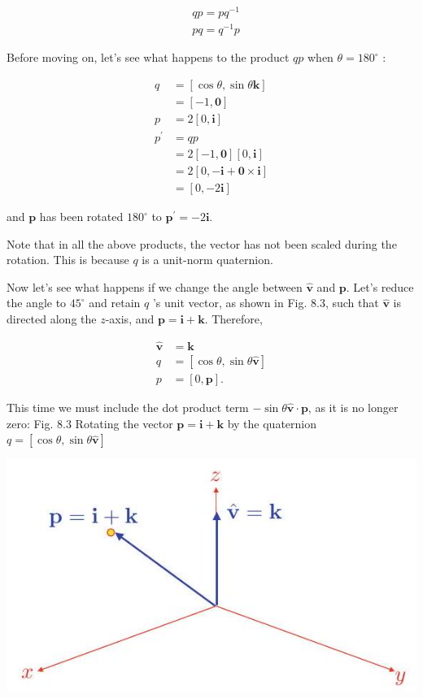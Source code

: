\documentclass[10pt]{article}
\begin{document}
$$
\begin{aligned}
& q p=p q^{-1} \\
& p q=q^{-1} p
\end{aligned}
$$

Before moving on, let's see what happens to the product $q p$ when $\theta=180^{\circ}$ :

$$
\begin{aligned}
q & =[\cos \theta, \sin \theta \mathbf{k}] \\
& =[-1, \mathbf{0}] \\
p & =2[0, \mathbf{i}] \\
p^{\prime} & =q p \\
& =2[-1, \mathbf{0}][0, \mathbf{i}] \\
& =2[0,-\mathbf{i}+\mathbf{0} \times \mathbf{i}] \\
& =[0,-2 \mathbf{i}]
\end{aligned}
$$

and $\mathbf{p}$ has been rotated $180^{\circ}$ to $\mathbf{p}^{\prime}=-2 \mathbf{i}$.

Note that in all the above products, the vector has not been scaled during the rotation. This is because $q$ is a unit-norm quaternion.

Now let's see what happens if we change the angle between $\hat{\mathbf{v}}$ and $\mathbf{p}$. Let's reduce the angle to $45^{\circ}$ and retain $q$ 's unit vector, as shown in Fig. 8.3, such that $\hat{\mathbf{v}}$ is directed along the $z$-axis, and $\mathbf{p}=\mathbf{i}+\mathbf{k}$. Therefore,

$$
\begin{aligned}
\hat{\mathbf{v}} & =\mathbf{k} \\
q & =[\cos \theta, \sin \theta \hat{\mathbf{v}}] \\
p & =[0, \mathbf{p}] .
\end{aligned}
$$

This time we must include the dot product term $-\sin \theta \hat{\mathbf{v}} \cdot \mathbf{p}$, as it is no longer zero: Fig. 8.3 Rotating the vector $\mathbf{p}=\mathbf{i}+\mathbf{k}$ by the quaternion $q=[\cos \theta, \sin \theta \hat{\mathbf{v}}]$

\begin{center}
\includegraphics[max width=\textwidth]{2023_04_20_41f1ceac5a31dc7d1b59g-144}
\end{center}
\end{document}
